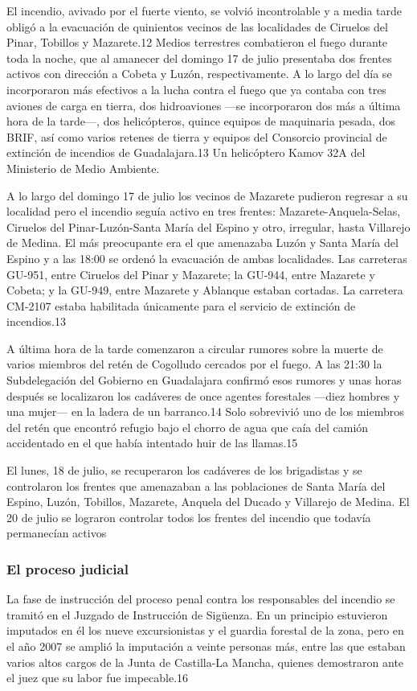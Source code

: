 El incendio, avivado por el fuerte viento, se volvió incontrolable y a media tarde obligó a la evacuación de quinientos vecinos de las localidades de Ciruelos del Pinar, Tobillos y Mazarete.12​ Medios terrestres combatieron el fuego durante toda la noche, que al amanecer del domingo 17 de julio presentaba dos frentes activos con dirección a Cobeta y Luzón, respectivamente. A lo largo del día se incorporaron más efectivos a la lucha contra el fuego que ya contaba con tres aviones de carga en tierra, dos hidroaviones —se incorporaron dos más a última hora de la tarde—, dos helicópteros, quince equipos de maquinaria pesada, dos BRIF, así como varios retenes de tierra y equipos del Consorcio provincial de extinción de incendios de Guadalajara.13​
Un helicóptero Kamov 32A del Ministerio de Medio Ambiente.


A lo largo del domingo 17 de julio los vecinos de Mazarete pudieron regresar a su localidad pero el incendio seguía activo en tres frentes: Mazarete-Anquela-Selas, Ciruelos del Pinar-Luzón-Santa María del Espino y otro, irregular, hasta Villarejo de Medina. El más preocupante era el que amenazaba Luzón y Santa María del Espino y a las 18:00 se ordenó la evacuación de ambas localidades. Las carreteras GU-951, entre Ciruelos del Pinar y Mazarete; la GU-944, entre Mazarete y Cobeta; y la GU-949, entre Mazarete y Ablanque estaban cortadas. La carretera CM-2107 estaba habilitada únicamente para el servicio de extinción de incendios.13​


A última hora de la tarde comenzaron a circular rumores sobre la muerte de varios miembros del retén de Cogolludo cercados por el fuego. A las 21:30 la Subdelegación del Gobierno en Guadalajara confirmó esos rumores y unas horas después se localizaron los cadáveres de once agentes forestales —diez hombres y una mujer— en la ladera de un barranco.14​ Solo sobrevivió uno de los miembros del retén que encontró refugio bajo el chorro de agua que caía del camión accidentado en el que había intentado huir de las llamas.15​


El lunes, 18 de julio, se recuperaron los cadáveres de los brigadistas y se controlaron los frentes que amenazaban a las poblaciones de Santa María del Espino, Luzón, Tobillos, Mazarete, Anquela del Ducado y Villarejo de Medina. El 20 de julio se lograron controlar todos los frentes del incendio que todavía permanecían activos
\subsubsection{El proceso judicial}
La fase de instrucción del proceso penal contra los responsables del incendio se tramitó en el Juzgado de Instrucción de Sigüenza. En un principio estuvieron imputados en él los nueve excursionistas y el guardia forestal de la zona, pero en el año 2007 se amplió la imputación a veinte personas más, entre las que estaban varios altos cargos de la Junta de Castilla-La Mancha, quienes demostraron ante el juez que su labor fue impecable.16​



